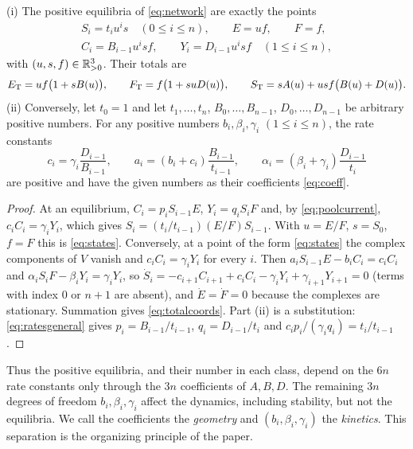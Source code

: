 \begin{proposition}\label{prop:param}
\textup{(i)} The positive equilibria of \eqref{eq:network} are exactly the points
\begin{equation}\label{eq:states}
\begin{gathered}
 S_i=t_i u^i s \quad(0\le i\le n),\qquad E=uf,\qquad F=f,\\
 C_i=B_{i-1}u^i sf,\qquad Y_i=D_{i-1}u^i sf \quad(1\le i\le n),
\end{gathered}
\end{equation}
with \((u,s,f)\in\mathbb R^3_{>0}\). Their totals are
\begin{equation}\label{eq:totalcoords}
 E_{\mathrm T}=uf\bigl(1+sB(u)\bigr),\qquad F_{\mathrm T}=f\bigl(1+suD(u)\bigr),\qquad
 S_{\mathrm T}=sA(u)+usf\bigl(B(u)+D(u)\bigr).
\end{equation}
\textup{(ii)} Conversely, let \(t_0=1\) and let \(t_1,\dots,t_n\), \(B_0,\dots,B_{n-1}\),
\(D_0,\dots,D_{n-1}\) be arbitrary positive numbers. For any positive numbers
\(b_i,\beta_i,\gamma_i\) \((1\le i\le n)\), the rate constants
\begin{equation}\label{eq:ratesgeneral}
 c_i=\gamma_i\frac{D_{i-1}}{B_{i-1}},\qquad
 a_i=(b_i+c_i)\frac{B_{i-1}}{t_{i-1}},\qquad
 \alpha_i=(\beta_i+\gamma_i)\frac{D_{i-1}}{t_i}
\end{equation}
are positive and have the given numbers as their coefficients \eqref{eq:coeff}.
\end{proposition}
\begin{proof}
At an equilibrium, \(C_i=p_iS_{i-1}E\), \(Y_i=q_iS_iF\) and, by \eqref{eq:poolcurrent},
\(c_iC_i=\gamma_iY_i\), which gives \(S_i=(t_i/t_{i-1})(E/F)S_{i-1}\). With \(u=E/F\),
\(s=S_0\), \(f=F\) this is \eqref{eq:states}. Conversely, at a point of the form
\eqref{eq:states} the complex components of \(V\) vanish and \(c_iC_i=\gamma_iY_i\) for every
\(i\). Then \(a_iS_{i-1}E-b_iC_i=c_iC_i\) and \(\alpha_iS_iF-\beta_iY_i=\gamma_iY_i\), so
\(\dot S_i=-c_{i+1}C_{i+1}+c_iC_i-\gamma_iY_i+\gamma_{i+1}Y_{i+1}=0\) (terms with index \(0\)
or \(n+1\) are absent), and \(\dot E=\dot F=0\) because the complexes are stationary. Summation
gives \eqref{eq:totalcoords}. Part (ii) is a substitution: \eqref{eq:ratesgeneral} gives
\(p_i=B_{i-1}/t_{i-1}\), \(q_i=D_{i-1}/t_i\) and \(c_ip_i/(\gamma_iq_i)=t_i/t_{i-1}\).
\end{proof}

Thus the positive equilibria, and their number in each class, depend on the \(6n\) rate
constants only through the \(3n\) coefficients of \(A,B,D\). The remaining \(3n\) degrees of
freedom \(b_i,\beta_i,\gamma_i\) affect the dynamics, including stability, but not the
equilibria. We call the coefficients the \emph{geometry} and \((b_i,\beta_i,\gamma_i)\) the
\emph{kinetics}. This separation is the organizing principle of the paper.

